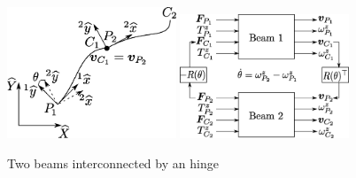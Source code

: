 \begin{figure}[t]
	\centering
	\includegraphics[width=0.45\textwidth]{beam_int.eps} 
	\includegraphics[width=0.45\textwidth]{block_hinged_beam.eps} 
	\caption{Two beams interconnected by an hinge }
	\label{fig:beam_int}
\end{figure}

